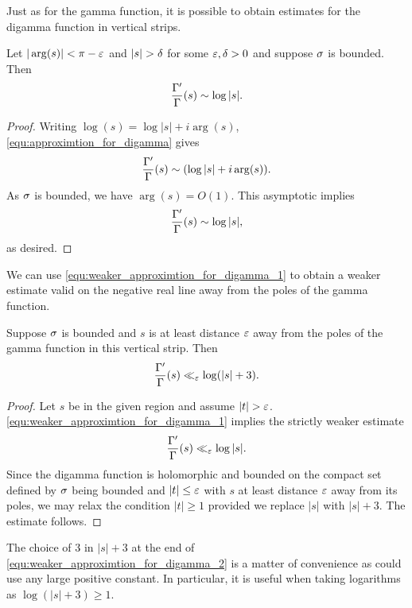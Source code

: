     Just as for the gamma function, it is possible to obtain estimates for the digamma function in vertical strips.

    \begin{corollary}\label{equ:weaker_approximtion_for_digamma_1}
      Let \(|\arg(s)| < \pi-\varepsilon\) and \(|s| > \delta\) for some \(\varepsilon,\delta > 0\) and suppose \(\sigma\) is bounded. Then
      \[
        \frac{\Gamma'}{\Gamma}(s) \sim \log|s|.
      \]
    \end{corollary}
    \begin{proof}
      Writing \(\log(s) = \log|s|+i\arg(s)\), \cref{equ:approximtion_for_digamma} gives
      \[
        \frac{\Gamma'}{\Gamma}(s) \sim (\log|s|+i\arg(s)).
      \]
      As \(\sigma\) is bounded, we have \(\arg(s) = O(1)\). This asymptotic implies
      \[
        \frac{\Gamma'}{\Gamma}(s) \sim \log|s|,
      \]
      as desired.
    \end{proof}

    We can use \cref{equ:weaker_approximtion_for_digamma_1} to obtain a weaker estimate valid on the negative real line away from the poles of the gamma function.

    \begin{corollary}\label{equ:weaker_approximtion_for_digamma_2}
      Suppose \(\sigma\) is bounded and \(s\) is at least distance \(\varepsilon\) away from the poles of the gamma function in this vertical strip. Then
      \[
        \frac{\Gamma'}{\Gamma}(s) \ll_{\varepsilon} \log(|s|+3).
      \]
    \end{corollary}
    \begin{proof}
      Let \(s\) be in the given region and assume \(|t| > \varepsilon\). \cref{equ:weaker_approximtion_for_digamma_1} implies the strictly weaker estimate
      \[
        \frac{\Gamma'}{\Gamma}(s) \ll_{\varepsilon} \log|s|.
      \]
      Since the digamma function is holomorphic and bounded on the compact set defined by \(\sigma\) being bounded and \(|t| \le \varepsilon\) with \(s\) at least distance \(\varepsilon\) away from its poles, we may relax the condition \(|t| \ge 1\) provided we replace \(|s|\) with \(|s|+3\). The estimate follows.
    \end{proof}

    The choice of \(3\) in \(|s|+3\) at the end of \cref{equ:weaker_approximtion_for_digamma_2} is a matter of convenience as could use any large positive constant. In particular, it is useful when taking logarithms as \(\log(|s|+3) \ge 1\).